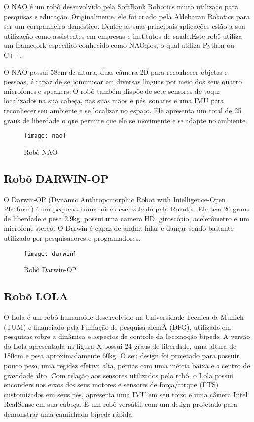 O NAO é um robô desenvolvido pela SoftBank Robotics muito utilizado para pesquisas e educação. Originalmente, ele foi criado pela Aldebaran Robotics para ser um companheiro doméstico. Dentre as suas principais aplicações estão a sua utilização como assistentes em empresas e institutos de saúde.Este robô utiliza um frameqork específico conhecido como NAOqios, o qual utiliza Python ou C++.  

O NAO possui 58cm de altura, duas câmera 2D para reconhecer objetos e pessoas, é capaz de se comunicar em diversas línguas por meio dos seus quatro microfones e speakers. O robô também dispõe de sete sensores de toque localizados na sua cabeça, nas suas mãos e pés, sonares e uma IMU para reconhecer seu ambiente e se localizar no espaço. Ele apresenta um total de 25 graus de liberdade o que permite que ele se movimente e se adapte no ambiente.

\begin{figure} [H]	
    \centering
    \caption{Robô NAO}
    \texttt{[image: nao]}
    \label{fig:nao}
\end{figure}

\subsection{Robô DARWIN-OP}
\label{ssec:darwin}

O Darwin-OP (Dynamic Anthropomorphic Robot with Intelligence-Open Platform)  é um pequeno humanoide desenvolvido pela Robotis. Ele tem 20 graus de liberdade e pesa 2.9kg, possui uma camera HD, giroscópio, acelerômetro e um microfone stereo. O Darwin é capaz de andar, falar e dançar sendo bastante utilizado por pesquisadores e programadores.

\begin{figure} [H]
    \centering
    \caption{Robô Darwin-OP}
    \texttt{[image: darwin]}
    \label{fig:darwin}
\end{figure}

\subsection{Robô LOLA}
\label{ssec:lola}

O Lola é um robô humanoide desenvolvido na Universidade Tecnica de Munich (TUM) e financiado pela Funfação de pesquisa alemÂ (DFG), utilizado em pesquisas sobre a dinâmica e aspectos de controle da locomoção bípede. A versão do Lola apresentada na figura X possui 24 graus de liberdade, uma altura de 180cm e pesa aproximadamente 60kg. O seu design foi projetado para possuir pouco peso, uma regidez efetiva alta, pernas com uma inércia baixa e o centro de gravidade alto. Com relação aos sensores utilizados pelo robô, o Lola possui enconders nos eixos dos seus motores e sensores de força/torque (FTS) customizados em seus pés, apresenta uma IMU em seu torso e uma câmera Intel RealSense em sua cabeça. É um robô versátil, com um design projetado para demonstrar uma caminhada bípede rápida.

